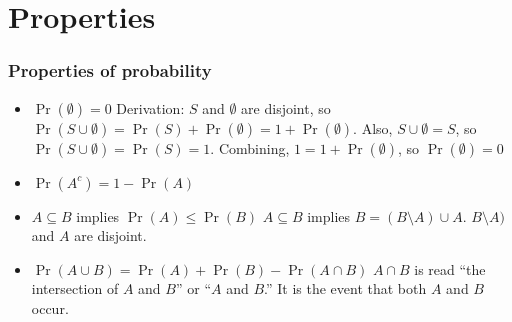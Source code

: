 

\section{Properties}


\begin{frame}
\frametitle{Properties of probability}
\begin{itemize}
\item $\Pr(\emptyset) = 0$ 
Derivation: $S$ and $\emptyset$ are disjoint,
so $\Pr(S \cup \emptyset) = \Pr(S) + \Pr(\emptyset) = 1 +
\Pr(\emptyset)$. Also, $S \cup \emptyset = S$, so $\Pr(S \cup \emptyset) = \Pr(S) = 1$. Combining, $1 = 1 + \Pr(\emptyset)$, so $\Pr(\emptyset) = 0$
\item $\Pr(A^c) = 1 - \Pr(A)$
\item $A \subseteq B$ implies $\Pr(A) \leq \Pr(B)$
$A \subseteq B$ implies $B = (B \setminus A) \cup A$. $B
\setminus A)$ and $A$ are disjoint.
\item $\Pr(A \cup B) = \Pr(A) + \Pr(B) - \Pr(A \cap B)$ 
$A \cap B$ is read ``the intersection of $A$ and $B$'' or ``$A$ and $B$.'' It is the event that both $A$ and $B$ occur. 
\end{itemize}
\end{frame}

